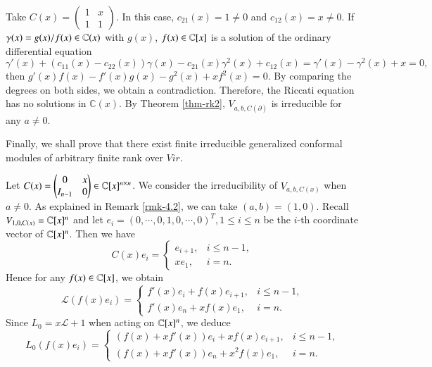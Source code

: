 \documentclass[12pt]{amsart}
\begin{document}
\begin{ex}
Take $C(x)=\begin{pmatrix}1&x\\
1&1
\end{pmatrix}$. In this case, $c_{21}(x)=1\neq0$ and $c_{12}(x)=x\neq0$. If $\gamma(x)=g(x)/f(x)\in\mathbb{C}(x)$ with $g(x)$, $f(x)\in \mathbb{C}[x]$ is a solution of the ordinary differential equation $$\gamma'(x)+(c_{11}(x)-c_{22}(x))\gamma(x)-c_{21}(x)\gamma^2(x)+c_{12}(x)
=\gamma'(x)-\gamma^2(x)+x=0,$$ then $g'(x)f(x)-f'(x)g(x)-g^2(x)+xf^2(x)=0$.
By comparing the degrees on both sides, we obtain a contradiction. Therefore, the Riccati equation has no solutions in $\mathbb C(x)$. By Theorem \ref{thm-rk2}, $V_{a,b,C(\partial)}$ is irreducible for any $a\neq0$.
\end{ex}

Finally, we shall prove that there exist finite irreducible generalized conformal modules of arbitrary finite rank over $Vir$.

Let $C(x) =\begin{pmatrix} 0 & x  \\  I_{n-1} & 0 \end{pmatrix}\in\mathbb{C}[x]^{n\times n}$. We consider the irreducibility of $V_{a,b,C(x)}$ when $a\neq0$. As explained in Remark \ref{rmk-4.2}, we can take $(a,b)=(1,0)$.
Recall $V_{1,0,C(x)}=\mathbb{C}[x]^n$ and let $e_i=(0,\cdots,0,1,0,\cdots,0)^T, 1\leq i\leq n$ be
the $i$-th coordinate vector of $\mathbb{C}[x]^n$. Then we have
$$C(x)e_i=
\begin{cases}
e_{i+1},&i\leq n-1, \\
xe_1,&i=n.
\end{cases}$$
Hence for any $f(x)\in\mathbb{C}[x]$, we obtain
$$\mathcal{L}(f(x)e_i)=
\begin{cases}
f'(x)e_i+f(x)e_{i+1},&i\leq n-1, \\
f'(x)e_n+xf(x)e_1, &i=n.
\end{cases}$$
Since $L_0=x\mathcal{L}+1$ when acting on $\mathbb{C}[x]^n$, we deduce
\begin{equation}\label{rmk-eq1}
L_0(f(x)e_i)=
\begin{cases}
(f(x)+xf'(x))e_i+xf(x)e_{i+1},&i\leq n-1, \\
(f(x)+xf'(x))e_n+x^2f(x)e_1, &i=n.
\end{cases}
\end{equation}
\end{document}
